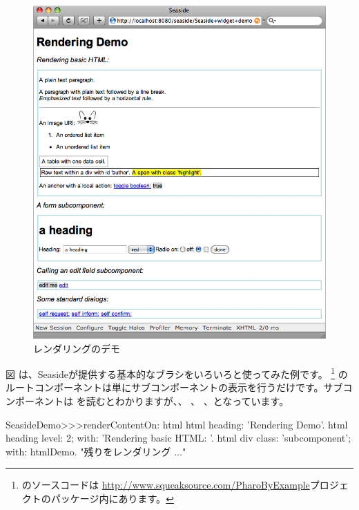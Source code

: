 \documentclass[a4paper,10pt,twoside]{book}
\begin{document}
\begin{figure}[ht]
\begin{center}
\includegraphics[width=\textwidth]{RenderingDemo}
\caption{レンダリングのデモ}
\end{center}
\end{figure}

図 は、Seasideが提供する基本的なブラシをいろいろと使ってみた例です。 \footnote{
 のソースコードは  \url{http://www.squeaksource.com/PharoByExample}プロジェクトのパッケージ内にあります。}  のルートコンポーネントは単にサブコンポーネントの表示を行うだけです。サブコンポーネントは を読むとわかりますが、、 、 、となっています。
 
\needspace{7ex}
\begin{method}[renderdemo]{}
SeasideDemo>>>renderContentOn: html
	html heading: 'Rendering Demo'.
	html heading
		level: 2;
		with: 'Rendering basic HTML: '.
	html div
		class: 'subcomponent';
		with: htmlDemo.
	"残りをレンダリング ..."
\end{method}
\end{document}

